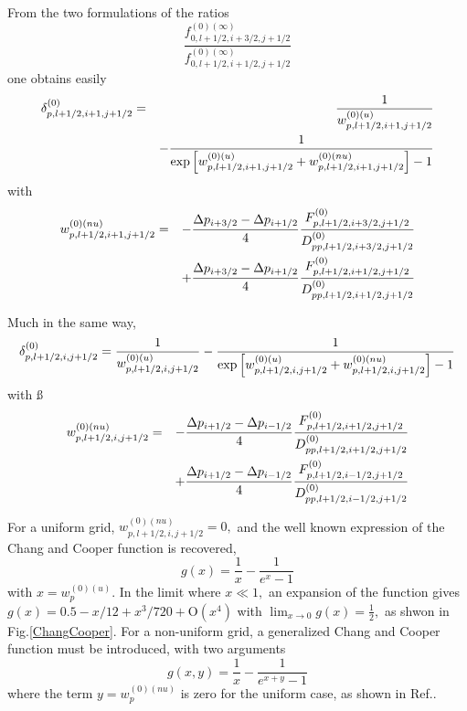 From the two formulations of the ratios
\begin{equation}
\frac{f_{0,l+1/2,i+3/2,j+1/2}^{\left( 0\right) (\infty )}}{
f_{0,l+1/2,i+1/2,j+1/2}^{\left( 0\right) (\infty )}}
\end{equation}
one obtains easily
\begin{eqnarray}
\delta _{p,l+1/2,i+1,j+1/2}^{\left( 0\right) } &=&\frac{1}{%
w_{p,l+1/2,i+1,j+1/2}^{\left( 0\right) (u)}}  \nonumber \\
&&-\frac{1}{\exp \left[ w_{p,l+1/2,i+1,j+1/2}^{\left( 0\right)
(u)}+w_{p,l+1/2,i+1,j+1/2}^{\left( 0\right) (nu)}\right] -1}
\end{eqnarray}
with
\begin{eqnarray}
w_{p,l+1/2,i+1,j+1/2}^{\left( 0\right) (nu)} &=&-\frac{\Delta
p_{i+3/2}-\Delta p_{i+1/2}}{4}\frac{F_{p,l+1/2,i+3/2,j+1/2}^{\left( 0\right)
}}{D_{pp,l+1/2,i+3/2,j+1/2}^{\left( 0\right) }}  \nonumber \\
&&+\frac{\Delta p_{i+3/2}-\Delta p_{i+1/2}}{4}\frac{%
F_{p,l+1/2,i+1/2,j+1/2}^{\left( 0\right) }}{D_{pp,l+1/2,i+1/2,j+1/2}^{\left(
0\right) }}
\end{eqnarray}

Much in the same way,
\begin{equation}
\delta _{p,l+1/2,i,j+1/2}^{\left( 0\right) }=\frac{1}{w_{p,l+1/2,i,j+1/2}^{%
\left( 0\right) (u)}}-\frac{1}{\exp \left[ w_{p,l+1/2,i,j+1/2}^{\left(
0\right) (u)}+w_{p,l+1/2,i,j+1/2}^{\left( 0\right) (nu)}\right] -1}
\end{equation}
with \ss
\begin{eqnarray}
w_{p,l+1/2,i,j+1/2}^{\left( 0\right) (nu)} &=&-\frac{\Delta p_{i+1/2}-\Delta
p_{i-1/2}}{4}\frac{F_{p,l+1/2,i+1/2,j+1/2}^{\left( 0\right) }}{%
D_{pp,l+1/2,i+1/2,j+1/2}^{\left( 0\right) }}  \nonumber \\
&&+\frac{\Delta p_{i+1/2}-\Delta p_{i-1/2}}{4}\frac{%
F_{p,l+1/2,i-1/2,j+1/2}^{\left( 0\right) }}{D_{pp,l+1/2,i-1/2,j+1/2}^{\left(
0\right) }}
\end{eqnarray}

For a uniform grid, $w_{p,l+1/2,i,j+1/2}^{\left( 0\right) (nu)}=0,$ and the
well known expression of the Chang and Cooper function is recovered,
\begin{equation}
g\left( x\right) =\frac{1}{x}-\frac{1}{e^{x}-1}
\end{equation}
with $x=w_{p}^{\left( 0\right) (u)}.$ In the limit where $x\ll 1,$ an
expansion of the function gives $g\left( x\right) =0.5-x/12+x^{3}/720+%
\mathrm{O}\left( x^{4}\right) $ with $\lim_{x\rightarrow 0}g\left( x\right) =%
\frac{1}{2},$ as shwon in Fig.\ref{ChangCooper}. For a non-uniform grid, a
generalized Chang and Cooper function must be introduced, with two arguments
\begin{equation}
g\left( x,y\right) =\frac{1}{x}-\frac{1}{e^{x+y}-1}
\end{equation}
where the term $y=w_{p}^{\left( 0\right) (nu)}$ is zero for the uniform
case, as shown in Ref.\cite{biz97}.

